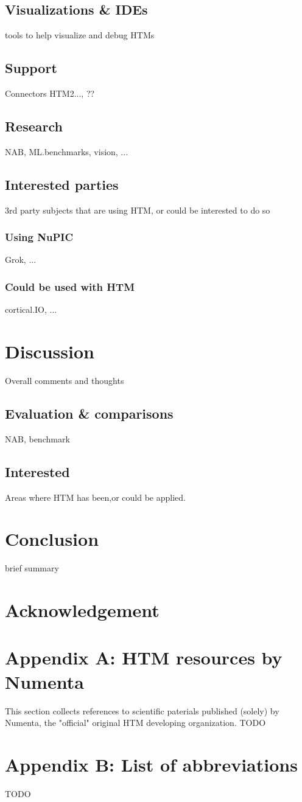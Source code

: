 \documentclass[a4,IEEEconf]{article}
\begin{document}
\subsection{Visualizations \& IDEs}
tools to help visualize and debug HTMs
\subsection{Support}
Connectors HTM2..., ??
\subsection{Research}
NAB, ML.benchmarks, vision, ...
\subsection{Interested parties}
3rd party subjects that are using HTM, or could be interested to do so
\subsubsection{Using NuPIC}
Grok, ...
\subsubsection{Could be used with HTM}
cortical.IO, ...

\section{Discussion}
Overall comments and thoughts
\subsection{Evaluation \& comparisons}
NAB, benchmark
\subsection{Interested}
Areas where HTM has been,or could be applied. 

\section{Conclusion}
brief summary

\section{Acknowledgement}

\section{Appendix A: HTM resources by Numenta}
This section collects references to scientific paterials published (solely) by Numenta, the "official" original HTM developing organization. 
TODO
\section{Appendix B: List of abbreviations}
TODO


\end{document}
